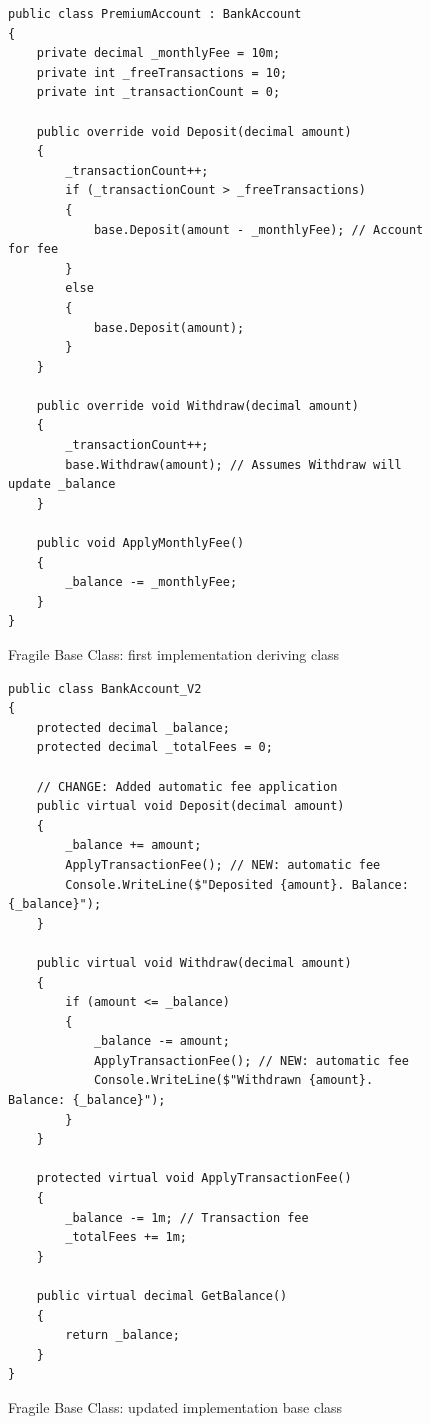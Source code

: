 \begin{figure}
    \centering
    \begin{verbatim}
public class PremiumAccount : BankAccount
{
    private decimal _monthlyFee = 10m;
    private int _freeTransactions = 10;
    private int _transactionCount = 0;
    
    public override void Deposit(decimal amount)
    {
        _transactionCount++;
        if (_transactionCount > _freeTransactions)
        {
            base.Deposit(amount - _monthlyFee); // Account for fee
        }
        else
        {
            base.Deposit(amount);
        }
    }
    
    public override void Withdraw(decimal amount)
    {
        _transactionCount++;
        base.Withdraw(amount); // Assumes Withdraw will update _balance
    }
    
    public void ApplyMonthlyFee()
    {
        _balance -= _monthlyFee;
    }
}
    \end{verbatim}
    \caption{Fragile Base Class: first implementation deriving class}
    \label{fig:fragile-base-class-first-implementation-deriving-class}
\end{figure}

\begin{figure}
    \centering
    \begin{verbatim}
public class BankAccount_V2
{
    protected decimal _balance;
    protected decimal _totalFees = 0;
    
    // CHANGE: Added automatic fee application
    public virtual void Deposit(decimal amount)
    {
        _balance += amount;
        ApplyTransactionFee(); // NEW: automatic fee
        Console.WriteLine($"Deposited {amount}. Balance: {_balance}");
    }
    
    public virtual void Withdraw(decimal amount)
    {
        if (amount <= _balance)
        {
            _balance -= amount;
            ApplyTransactionFee(); // NEW: automatic fee
            Console.WriteLine($"Withdrawn {amount}. Balance: {_balance}");
        }
    }
    
    protected virtual void ApplyTransactionFee()
    {
        _balance -= 1m; // Transaction fee
        _totalFees += 1m;
    }
    
    public virtual decimal GetBalance()
    {
        return _balance;
    }
}
    \end{verbatim}
    \caption{Fragile Base Class: updated implementation base class}
    \label{fig:fragile-base-class-updated-implementation-base-class}
\end{figure}

